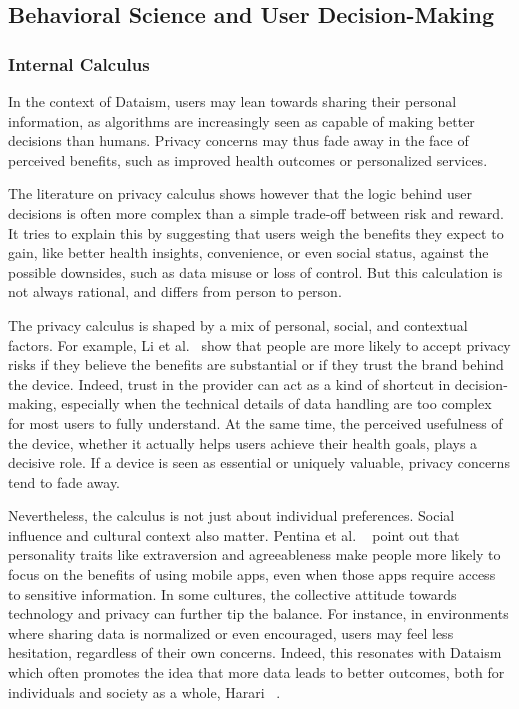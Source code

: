 \subsection{Behavioral Science and User Decision-Making}
	\subsubsection{Internal Calculus}

	In the context of Dataism, users may lean towards sharing their personal information, as algorithms are increasingly seen as capable of making better decisions than humans. Privacy concerns may thus fade away in the face of perceived benefits, such as improved health outcomes or personalized services. 

	The literature on privacy calculus shows however that the logic behind user decisions is often more complex than a simple trade-off between risk and reward. It tries to explain this by suggesting that users weigh the benefits they expect to gain, like better health insights, convenience, or even social status, against the possible downsides, such as data misuse or loss of control. But this calculation is not always rational, and differs from person to person.

	The privacy calculus is shaped by a mix of personal, social, and contextual factors. For example, Li et al.~\cite{Li2016} show that people are more likely to accept privacy risks if they believe the benefits are substantial or if they trust the brand behind the device. Indeed, trust in the provider can act as a kind of shortcut in decision-making, especially when the technical details of data handling are too complex for most users to fully understand. At the same time, the perceived usefulness of the device, whether it actually helps users achieve their health goals, plays a decisive role. If a device is seen as essential or uniquely valuable, privacy concerns tend to fade away.

	Nevertheless, the calculus is not just about individual preferences. Social influence and cultural context also matter. Pentina et al. ~\cite{Pentina2016} point out that personality traits like extraversion and agreeableness make people more likely to focus on the benefits of using mobile apps, even when those apps require access to sensitive information. In some cultures, the collective attitude towards technology and privacy can further tip the balance. For instance, in environments where sharing data is normalized or even encouraged, users may feel less hesitation, regardless of their own concerns. Indeed, this resonates with Dataism which often promotes the idea that more data leads to better outcomes, both for individuals and society as a whole, Harari ~\cite{Harari2017}.

